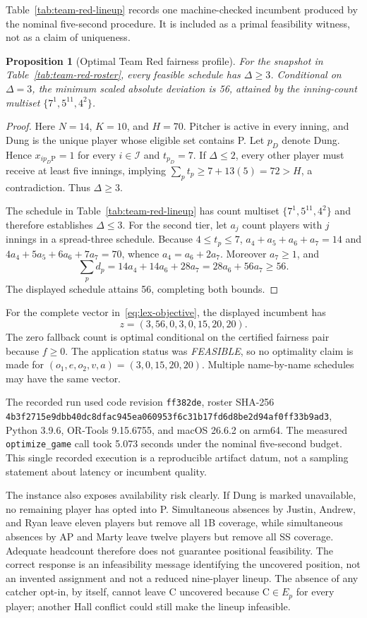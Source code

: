 \documentclass[11pt]{article}
\newcommand{\code}[1]{\texttt{#1}}
\newtheorem{proposition}{Proposition}
\begin{document}
Table~\ref{tab:team-red-lineup} records one machine-checked incumbent produced
by the nominal five-second procedure. It is included as a primal feasibility
witness, not as a claim of uniqueness.

\begin{proposition}[Optimal Team Red fairness profile]
\label{prop:team-red-fairness}
For the snapshot in Table~\ref{tab:team-red-roster}, every feasible schedule has
$\Delta\ge3$. Conditional on $\Delta=3$, the minimum scaled absolute deviation
is 56, attained by the inning-count multiset
$\{7^1,5^{11},4^2\}$.
\end{proposition}
\begin{proof}
Here $N=14$, $K=10$, and $H=70$. Pitcher is active in every inning, and Dung is
the unique player whose eligible set contains P. Let $p_D$ denote Dung. Hence
$x_{ip_D\mathrm P}=1$ for every $i\in\mathcal I$ and $t_{p_D}=7$.
If $\Delta\le2$, every other player must receive at least five innings, implying
$\sum_pt_p\ge7+13(5)=72>H$, a contradiction. Thus $\Delta\ge3$.

The schedule in Table~\ref{tab:team-red-lineup} has count multiset
$\{7^1,5^{11},4^2\}$ and therefore establishes $\Delta\le3$. For the second
tier, let $a_j$ count players with $j$ innings in a spread-three schedule.
Because $4\le t_p\le7$,
$a_4+a_5+a_6+a_7=14$ and
$4a_4+5a_5+6a_6+7a_7=70$, whence $a_4=a_6+2a_7$.
Moreover $a_7\ge1$, and
\[
\sum_pd_p=14a_4+14a_6+28a_7=28a_6+56a_7\ge56.
\]
The displayed schedule attains 56, completing both bounds.
\end{proof}

For the complete vector in~\eqref{eq:lex-objective}, the displayed incumbent has
\[
z=(3,56,0,3,0,15,20,20).
\]
The zero fallback count is optimal conditional on the certified fairness pair
because $f\ge0$. The application status was \emph{FEASIBLE}, so no optimality
claim is made for $(o_1,e,o_2,v,a)=(3,0,15,20,20)$. Multiple name-by-name
schedules may have the same vector.

The recorded run used code revision \code{ff382de}, roster SHA-256
\nolinkurl{4b3f2715e9dbb40dc8dfac945ea060953f6c31b17fd6d8be2d94af0ff33b9ad3},
Python 3.9.6, OR-Tools 9.15.6755, and macOS 26.6.2 on arm64. The measured
\code{optimize\_game} call took 5.073 seconds under the nominal five-second
budget. This single recorded execution is a reproducible artifact datum, not a
sampling statement about latency or incumbent quality.

The instance also exposes availability risk clearly. If Dung is marked
unavailable, no remaining player has opted into P. Simultaneous absences by
Justin, Andrew, and Ryan leave eleven players but remove all 1B coverage, while
simultaneous absences by AP and Marty leave twelve players but remove all SS
coverage. Adequate headcount therefore does not guarantee positional
feasibility. The correct response is an infeasibility message identifying the
uncovered position, not an invented assignment and not a reduced nine-player
lineup. The absence of any catcher opt-in, by itself, cannot leave C uncovered
because $\mathrm C\in E_p$ for every player; another Hall conflict could still
make the lineup infeasible.
\end{document}
